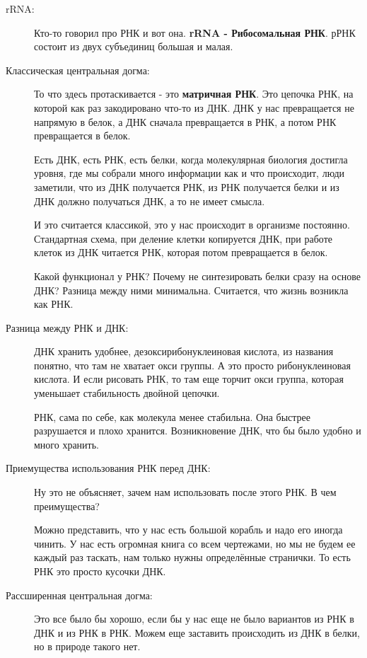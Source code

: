 \begin{description}
\item[rRNA:]
Кто-то говорил про РНК и вот она. \textbf{rRNA - Рибосомальная РНК}. 
рРНК состоит из двух субъединиц большая и малая. 

\item[Классическая центральная догма:]
То что здесь протаскивается - это \textbf{матричная РНК}. Это 
цепочка РНК, на которой как раз закодировано что-то из 
ДНК. ДНК у нас превращается не напрямую в белок, 
а ДНК сначала превращается в РНК, 
а потом РНК превращается в белок. 

Есть ДНК, есть РНК, есть белки, когда молекулярная 
биология достигла уровня, где мы собрали много информации 
как и что происходит, люди заметили, что из 
ДНК получается РНК, из РНК получается белки и из 
ДНК должно получаться ДНК, а то не имеет смысла. 

И это считается классикой, это у нас 
происходит в организме постоянно. Стандартная схема, 
при деление клетки копируется ДНК, при работе клеток 
из ДНК читается РНК, которая потом превращается в белок. 

Какой функционал у РНК? Почему не синтезировать 
белки сразу на основе ДНК? Разница между ними минимальна. 
Считается, что жизнь возникла как РНК. 

\item[Разница между РНК и ДНК:]
ДНК хранить удобнее, дезоксирибонуклеиновая кислота, из 
названия понятно, что там не хватает окси группы. А это 
просто рибонуклеиновая кислота. И если рисовать РНК, то 
там еще торчит окси группа, которая уменьшает стабильность 
двойной цепочки. 

РНК, сама по себе, как молекула менее стабильна. Она быстрее 
разрушается и плохо хранится. Возникновение ДНК, что бы 
было удобно и много хранить. 

\item[Приемущества использования РНК перед ДНК:]
Ну это не объясняет, зачем нам использовать после этого РНК. В чем 
преимущества? 

Можно представить, что у нас есть большой корабль и надо его 
иногда чинить. У нас есть огромная книга со всем чертежами, 
но мы не будем ее каждый раз таскать, нам только нужны определённые странички. 
То есть РНК это просто кусочки ДНК. 

\item[Рассширенная центральная догма:]
Это все было бы хорошо, если бы у нас 
еще не было вариантов из РНК в ДНК и из РНК в РНК. Можем
еще заставить происходить из ДНК в белки, но в природе такого нет.


\end{description}

